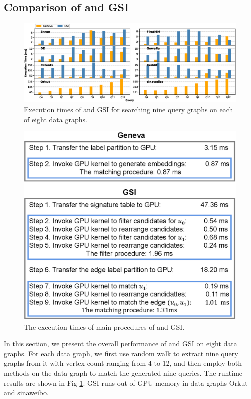\subsection{Comparison of \SystemName and GSI} \label{sec:comparegsi}
\begin{figure}
\centering
\includegraphics[width=\textwidth]{./figure/overperformance.eps}
\caption{Execution times of \SystemName and GSI for searching nine query graphs on each of eight data graphs.}	
\label{fig:overallperf}
\end{figure}

\begin{figure}
\centering
\includegraphics[width=\columnwidth]{./figure/comparegsi.eps}
\caption{The execution times of main procedures of \SystemName and GSI.}	
\label{fig:compdvgsi}
\end{figure}
In this section, we present the overall performance of \SystemName and GSI on eight data graphs. For each data graph, we first use random walk to extract nine query graphs from it with vertex count ranging from 4 to 12, and then employ both methods on the data graph to match the generated nine queries. The runtime results are shown in Fig \ref{fig:overallperf}. GSI runs out of GPU memory in data graphs Orkut and sinaweibo.

